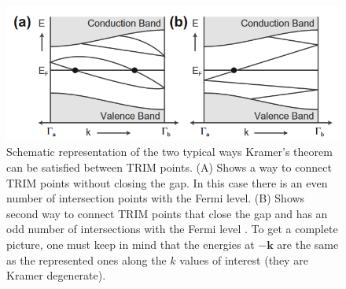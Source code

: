 \\[0.3cm]

\begin{figure}[t]
    \includegraphics[scale = 0.9]{sections/visuel/kramer.png}
    \caption{Schematic representation of the two typical ways Kramer's theorem can be satisfied between TRIM points. (A) Shows a way to connect TRIM points without closing the gap. In this case there is an even number of intersection points with the Fermi level. (B) Shows second way to connect TRIM points that close the gap and has an odd number of intersections with the Fermi level \cite{kane_topological_2013}. To get a complete picture, one must keep in mind that the energies at $-\mathbf{k}$ are the same as the represented ones along the $k$ values of interest (they are Kramer degenerate).}
    \label{TRIM}
\end{figure}

